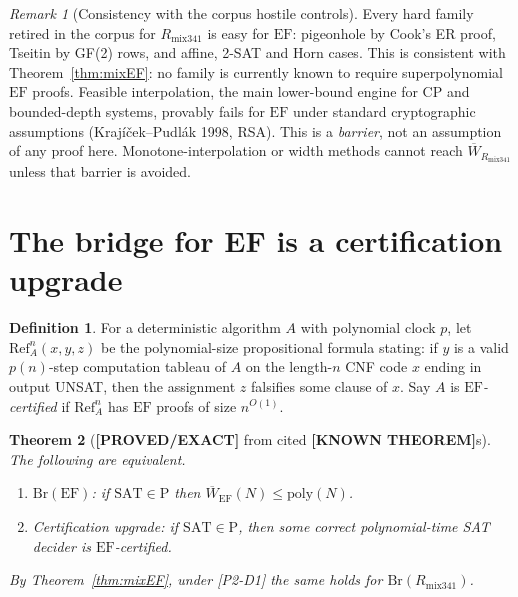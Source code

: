 \documentclass[11pt]{article}
\newtheorem{theorem}{Theorem}
\theoremstyle{definition}
\newtheorem{definition}[theorem]{Definition}
\theoremstyle{remark}
\newtheorem*{remark}{Remark}
\newcommand{\SAT}{\mathrm{SAT}}
\newcommand{\EF}{\mathrm{EF}}
\newcommand{\Rmix}{R_{\mathrm{mix341}}}
\newcommand{\Wbar}{\overline W}
\newcommand{\Ref}{\mathrm{Ref}}
\newcommand{\status}[1]{\textbf{[#1]}}
\begin{document}
\begin{remark}[Consistency with the corpus hostile controls]
Every hard family retired in the corpus for $\Rmix$ is easy for $\EF$: pigeonhole by Cook's ER proof,
Tseitin by GF(2) rows, and affine, 2-SAT and Horn cases. This is consistent with
Theorem~\ref{thm:mixEF}: no family is currently known to require superpolynomial $\EF$ proofs.
Feasible interpolation, the main lower-bound engine for CP and bounded-depth systems, provably fails
for $\EF$ under standard cryptographic assumptions (Kraj\'i\v{c}ek--Pudl\'ak 1998, RSA). This is a
\emph{barrier}, not an assumption of any proof here. Monotone-interpolation or width methods
cannot reach $\Wbar_{\Rmix}$ unless that barrier is avoided.
\end{remark}

\section{The bridge for EF is a certification upgrade}
\begin{definition}
For a deterministic algorithm $A$ with polynomial clock $p$, let $\Ref_A^n(x,y,z)$ be the
polynomial-size propositional formula stating: if $y$ is a valid $p(n)$-step computation tableau of $A$ on
the length-$n$ CNF code $x$ ending in output UNSAT, then the assignment $z$ falsifies some clause of $x$.
Say $A$ is \emph{$\EF$-certified} if $\Ref_A^n$ has $\EF$ proofs of size $n^{O(1)}$.
\end{definition}
\begin{theorem}[\status{PROVED/EXACT} from cited \status{KNOWN THEOREM}s]\label{thm:bridgeEF}
The following are equivalent.
\begin{enumerate}
\item[(i)] $\mathrm{Br}(\EF)$: if $\SAT\in\mathrm P$ then $\Wbar_\EF(N)\le\mathrm{poly}(N)$.
\item[(ii)] Certification upgrade: if $\SAT\in\mathrm P$, then some correct polynomial-time SAT decider is $\EF$-certified.
\end{enumerate}
By Theorem~\ref{thm:mixEF}, under [P2-D1] the same holds for $\mathrm{Br}(\Rmix)$.
\end{theorem}
\end{document}
